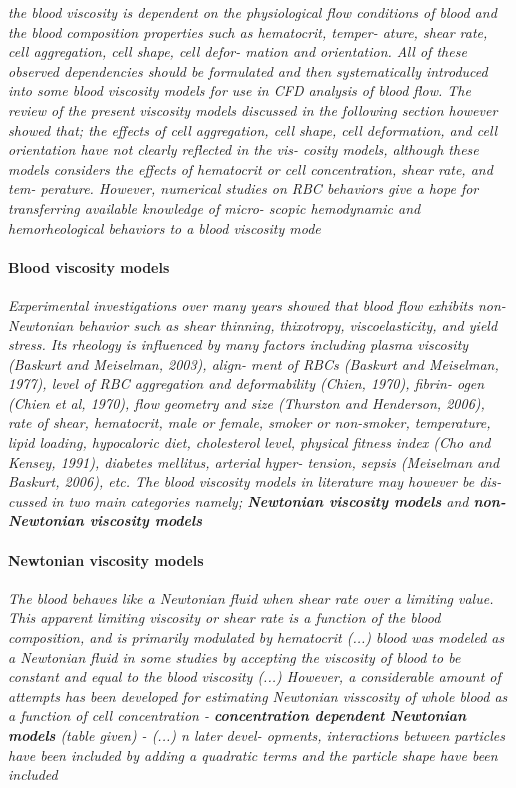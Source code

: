 \documentclass[11pt,letterpaper]{article}
\begin{document}
\textit{the  blood  viscosity  is  dependent on 
the physiological flow conditions of  blood and the
blood composition  properties  such as hematocrit, temper- ature, shear rate,  cell aggregation,  cell shape, cell defor- mation and orientation. All of  these observed dependencies should be formulated  and  then systematically introduced into some  blood viscosity models for use in CFD analysis of blood flow. The review of the present viscosity models discussed in the following section however showed that; the  effects of  cell aggregation, cell shape,  cell deformation, and cell orientation have not  clearly reflected in the vis- cosity  models, although these  models considers  the effects of  hematocrit  or cell concentration, shear rate, and tem- perature.  However, numerical studies on  RBC behaviors give a  hope for  transferring available  knowledge of micro- scopic hemodynamic and hemorheological behaviors to a blood viscosity mode}

\paragraph{Blood viscosity  models}
\textit{Experimental investigations over many years showed that blood flow exhibits non-Newtonian behavior such  as shear thinning, thixotropy, viscoelasticity, and yield stress. Its  rheology is influenced by many factors  including plasma viscosity (Baskurt and Meiselman, 2003),  align- ment of  RBCs  (Baskurt  and Meiselman, 1977), level of RBC aggregation and deformability (Chien,  1970),  fibrin- ogen (Chien  et al, 1970), flow  geometry and size (Thurston and Henderson, 2006), rate of shear, hematocrit, male  or female, smoker  or non-smoker, temperature,  lipid loading, hypocaloric diet, cholesterol  level,  physical fitness  index (Cho  and Kensey, 1991), diabetes mellitus, arterial hyper- tension, sepsis (Meiselman and  Baskurt, 2006),  etc. The blood  viscosity  models in literature may however be dis- cussed in two main categories namely;\newline
\textbf{Newtonian viscosity models} and \textbf{non-Newtonian viscosity models}}


\paragraph{Newtonian viscosity models}\textit{The  blood behaves like a Newtonian  fluid when shear
rate over a limiting value. This apparent  limiting viscosity or shear rate is a function of  the blood  composition, and  is primarily modulated by hematocrit (...)  blood was modeled as a Newtonian fluid in some studies by accepting the viscosity of blood to be constant and equal to the blood viscosity (...) However, a considerable 
amount  of attempts has been developed for estimating Newtonian visscosity of whole blood as a  function of cell concentration - \textbf{concentration dependent
Newtonian models} (table given) - (...) n later devel- opments, interactions  between  particles have been  included by  adding a quadratic terms and the particle shape have been included}
\end{document}
